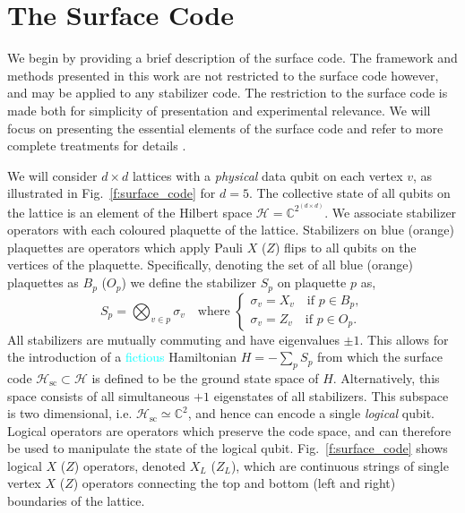 \documentclass[twocolumn,preprintnumbers,amsmath,amssymb,notitlepage,nofootinbib,longbibliography,superscriptaddress,aps,pra,10pt]{revtex4-1}
\newcommand{\je}[1]{\textcolor{cyan}{#1}}
\begin{document}
\section{The Surface Code}\label{s:the_surface_code}

	We begin by providing a brief description of the surface code.
	The framework and methods presented in this work are not restricted to the surface code however, and may be applied to any stabilizer code.
	The restriction to the surface code is made both for simplicity of presentation and experimental relevance.
	We will focus on presenting the essential elements of the surface code and refer to more complete treatments for details \cite{Gottesman97, Terhal15,Litinski18b}.

	We will consider $d\times d$ lattices with a \textit{physical} data qubit on each vertex $v$, as illustrated in Fig.~\ref{f:surface_code} for $d=5$.
	The collective state of all qubits on the lattice is an element of the Hilbert space $\mathcal{H} = \mathbb{C}^{2^{(d\times d)}}$.
	We associate stabilizer operators with each coloured plaquette of the lattice.
	Stabilizers on blue (orange) plaquettes are operators which apply Pauli $X$ ($Z$) flips to all qubits on the vertices of the plaquette.
	Specifically, denoting the set of all blue (orange) plaquettes as $B_p$ ($O_p$) we define the stabilizer $S_p$ on plaquette $p$ as,
	\begin{equation}\label{e:stabilizer_definition}
		S_p = \bigotimes_{v\in p} \sigma_v \quad \text{where }
		\begin{cases}
			\sigma_v = X_v \quad \text{if } p \in B_p,\\
			\sigma_v = Z_v \quad \text{if } p \in O_p.
		\end{cases}
	\end{equation}
	All stabilizers are mutually commuting and have eigenvalues $\pm 1$.
	This allows for the introduction of a \je{fictious} Hamiltonian $H = -\sum_p S_p$ from which the surface code $\mathcal{H}_\mathrm{sc} \subset \mathcal{H}$ is defined to be the ground state space of $H$.
	Alternatively, this space consists of all simultaneous $+1$ eigenstates of all stabilizers.
	This subspace is two dimensional, i.e. $\mathcal{H}_\mathrm{sc} \simeq \mathbb{C}^2$, and hence can encode a single \textit{logical} qubit.
	Logical operators are operators which preserve the code space, and can therefore be used to manipulate the state of the logical qubit.
	Fig.~\ref{f:surface_code} shows logical $X$ ($Z$) operators, denoted $X_L$ ($Z_L$), which are continuous strings of single vertex $X$ ($Z$) operators connecting the top and bottom (left and right) boundaries of the lattice.
	
\end{document}
